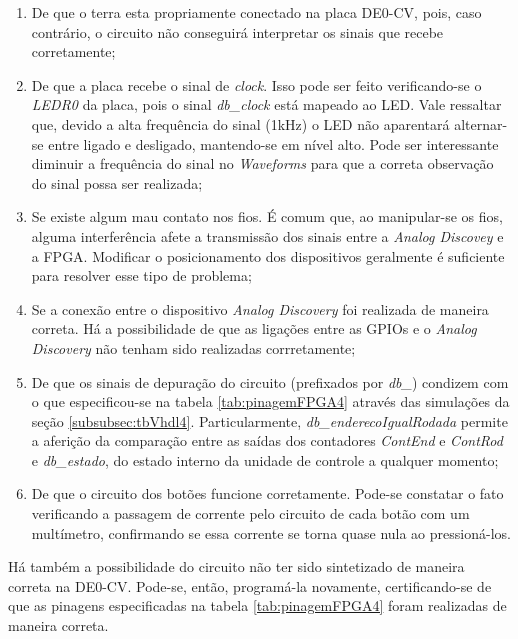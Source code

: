 \documentclass[amsmath,amssymb,floatfix]{report}
\begin{document}
\begin{enumerate}
    \item De que o terra esta propriamente conectado na placa DE0-CV, pois, caso contrário, o circuito não conseguirá interpretar os sinais que recebe corretamente;
   \item De que a placa recebe o sinal de \textit{clock}. Isso pode ser feito verificando-se o \textit{LEDR0} da placa, pois o sinal \textit{db\_clock} está mapeado ao LED. Vale ressaltar que, devido a alta frequência do sinal (1kHz) o LED não aparentará alternar-se entre ligado e desligado, mantendo-se em nível alto. Pode ser interessante diminuir a frequência do sinal no \textit{Waveforms} para que a correta observação do sinal possa ser realizada;
   \item Se existe algum mau contato nos fios. É comum que, ao manipular-se os fios, alguma interferência afete a transmissão dos sinais entre a \textit{Analog Discovey} e a FPGA. Modificar o posicionamento dos dispositivos geralmente é suficiente para resolver esse tipo de problema; 
   \item Se a conexão entre o dispositivo \textit{Analog Discovery} foi realizada de maneira correta. Há a possibilidade de que as ligações entre as GPIOs e o \textit{Analog Discovery} não tenham sido realizadas corrretamente;
   \item De que os sinais de depuração do circuito (prefixados por \textit{db\_}) condizem com o que especificou-se na tabela \ref{tab:pinagemFPGA4} através das simulações da seção \ref{subsubsec:tbVhdl4}. Particularmente, \textit{db\_enderecoIgualRodada} permite a aferição da comparação entre as saídas dos contadores \textit{ContEnd} e \textit{ContRod} e \textit{db\_estado}, do estado interno da unidade de controle a qualquer momento;
   \item De que o circuito dos botões funcione corretamente. Pode-se constatar o fato verificando a passagem de corrente pelo circuito de cada botão com um multímetro, confirmando se essa corrente se torna quase nula ao pressioná-los.
\end{enumerate}

Há também a possibilidade do circuito não ter sido sintetizado de maneira correta na DE0-CV. Pode-se, então, programá-la novamente, certificando-se de que as pinagens especificadas na tabela \ref{tab:pinagemFPGA4} foram realizadas de maneira correta.
\end{document}
